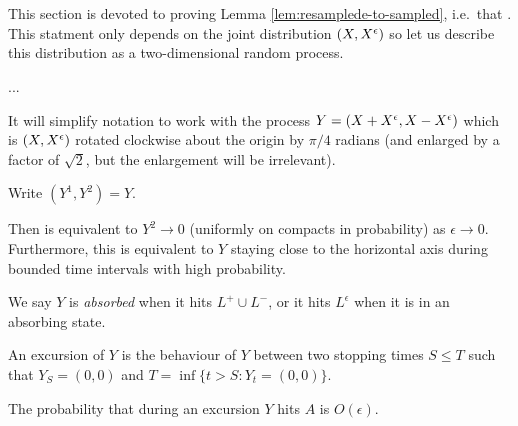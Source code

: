 {
\section{}
\label{sec:proof-of-lem:resamplede-to-sampled}

\newcommand{\bandwidth}{\delta}
\newcommand{\rotproc}{Y}

\newcommand{\union}{\cup}
\renewcommand{\L}{L^+ \union L^-}
\newcommand{\Le}{L^\epsilon}

This section is devoted to proving Lemma
\ref{lem:resamplede-to-sampled}, i.e.\ that
\statementoflemresampledetosampled.  This statment only depends on the
joint distribution $(X, X^{\epsilon})$ so let us describe this
distribution as a two-dimensional random process.

...

It will simplify notation to work with the process $\rotproc =
(\sampled + \resamplede, \sampled - \resamplede)$ which is $(X,
X^{\epsilon})$ rotated clockwise about the origin by $\pi / 4$ radians (and enlarged by a factor of
$\sqrt{2}$, but the enlargement will be irrelevant).

Write $(\rotproc^1, \rotproc^2) = Y$.

Then \statementoflemresampledetosampled{} is equivalent to $\rotproc^2
\to 0$ (uniformly on compacts in probability) as $\epsilon \to 0$.
Furthermore, this is equivalent to $\rotproc$ staying close to the
horizontal axis during bounded time intervals with high probability.


\newcommand{\boundarylines}{A}

\begin{definition}
  We say $Y$ is \emph{absorbed} when it hits $\L$, or it hits $\Le$
  when it is in an absorbing state.
\end{definition}

\newcommand{\farpoint}{(P,0)}
\newcommand{\origin}{(0,0)}

\begin{definition}
  An excursion of $Y$ is the behaviour of $Y$ between two stopping times
  $S \le T$ such that $Y_S =
  \origin$ and $T = \inf\{ t > S : Y_t = \origin \}$.
\end{definition}

\newcommand{\Omegaeloge}{\Omega(\epsilon\log\epsilon)}

\begin{lemma}
  \label{lem:Phitboundaryline}
  The probability that during an excursion $Y$ hits $\boundarylines$
  is $O(\epsilon)$.
\end{lemma}

}
